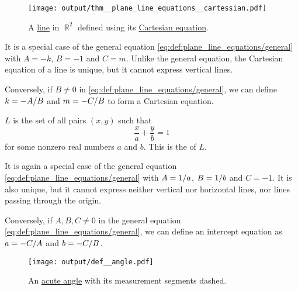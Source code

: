 \begin{definition}
\begin{thmenum}
    \begin{figure}[!ht]
      \centering
      \texttt{[image: output/thm\_\_plane\_line\_equations\_\_cartessian.pdf]}
      \caption{A \hyperref[def:affine_line]{line} in \( \BbbR^2 \) defined using its \hyperref[def:plane_line_equations/cartesian]{Cartesian equation}.}\label{eq:def:plane_line_equations/cartesian_drawing}
    \end{figure}

    It is a special case of the general equation \eqref{eq:def:plane_line_equations/general} with \( A = -k \), \( B = -1 \) and \( C = m \). Unlike the general equation, the Cartesian equation of a line is unique, but it cannot express vertical lines.

    Conversely, if \( B \neq 0 \) in \eqref{eq:def:plane_line_equations/general}, we can define \( k = -A / B \) and \( m = -C / B \) to form a Cartesian equation.

     \( L \) is the set of all pairs \( (x, y) \) such that
    \begin{equation}\label{def:plane_line_equations/intercept}
      \frac x a + \frac y b = 1
    \end{equation}
    for some nonzero real numbers \( a \) and \( b \). This is the  of \( L \).

    It is again a special case of the general equation \eqref{eq:def:plane_line_equations/general} with \( A = 1 / a \), \( B = 1 / b \) and \( C = -1 \). It is also unique, but it cannot express neither vertical nor horizontal lines, nor lines passing through the origin.

    Conversely, if \( A, B, C \neq 0 \) in the general equation \eqref{eq:def:plane_line_equations/general}, we can define an intercept equation as \( a = -C / A \) and \( b = -C / B \).
  \end{thmenum}
\end{definition}

\begin{figure}[!ht]
  \centering
  \texttt{[image: output/def\_\_angle.pdf]}
  \caption{An \hyperref[def:angle/acute]{acute angle} with its measurement segments dashed.}\label{def:angle/figure}
\end{figure}

